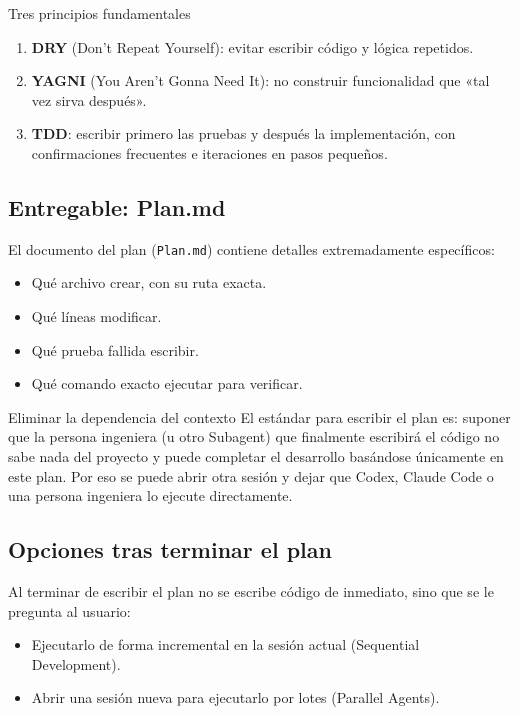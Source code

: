 \documentclass[a4paper]{article}
\begin{document}
\begin{importantbox}{Tres principios fundamentales}
\begin{enumerate}
    \item \textbf{DRY} (Don't Repeat Yourself): evitar escribir código y lógica repetidos.
    \item \textbf{YAGNI} (You Aren't Gonna Need It): no construir funcionalidad que «tal vez sirva después».
    \item \textbf{TDD}: escribir primero las pruebas y después la implementación, con confirmaciones frecuentes e iteraciones en pasos pequeños.
\end{enumerate}
\end{importantbox}

\subsection{Entregable: Plan.md}

El documento del plan (\texttt{Plan.md}) contiene detalles extremadamente específicos:
\begin{itemize}
    \item Qué archivo crear, con su ruta exacta.
    \item Qué líneas modificar.
    \item Qué prueba fallida escribir.
    \item Qué comando exacto ejecutar para verificar.
\end{itemize}

\begin{knowledgebox}{Eliminar la dependencia del contexto}
El estándar para escribir el plan es: suponer que la persona ingeniera (u otro Subagent) que finalmente escribirá el código no sabe nada del proyecto y puede completar el desarrollo basándose únicamente en este plan. Por eso se puede abrir otra sesión y dejar que Codex, Claude Code o una persona ingeniera lo ejecute directamente.
\end{knowledgebox}

\subsection{Opciones tras terminar el plan}

Al terminar de escribir el plan no se escribe código de inmediato, sino que se le pregunta al usuario:
\begin{itemize}
    \item Ejecutarlo de forma incremental en la sesión actual (Sequential Development).
    \item Abrir una sesión nueva para ejecutarlo por lotes (Parallel Agents).
\end{itemize}
\end{document}
